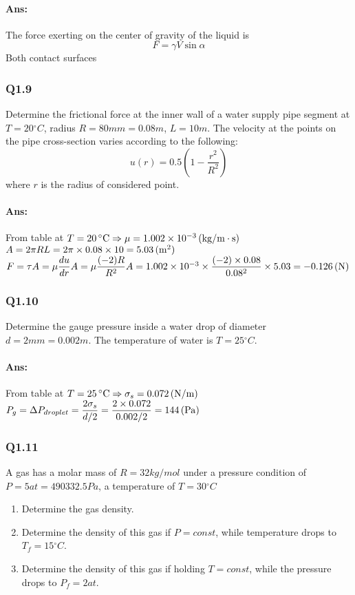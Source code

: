 \paragraph{Ans:}$  $\\
The force exerting on the center of gravity of the liquid is  \[F=\gamma V\sin\alpha\]
Both contact surfaces 

\subsubsection{Q1.9}
Determine the frictional force at the inner wall of a water supply pipe segment at $T= 20\unit{^\circ C} $, radius $ R = 80\unit{mm} = 0.08\unit{m}$, $L= 10 \unit{m} $. The velocity at the points on the pipe cross-section varies according
to the following:
\[u(r)=0.5\left(1-\dfrac{r^2}{R^2}\right)\]
where $ r $ is the radius of considered point.
\paragraph{Ans:}$ $\\
From table at $T= 20\, \mathrm{^\circ C} \Rightarrow \mu = 1.002\times10^{-3}\, (\mathrm{kg/m\cdot s})$\\
$ A = 2\pi R L = 2\pi\times 0.08\times 10 = 5.03\, (\mathrm{m^2})$\\
$F = \tau A = \mu \dfrac{du}{dr} A = \mu \dfrac{(-2)R}{R^2} A \\=1.002\times10^{-3} \times \dfrac{(-2)\times0.08}{0.08^2}\times 5.03 = -0.126\, (\mathrm{N})$

\subsubsection{Q1.10}
Determine the gauge pressure inside a water drop of diameter $ d = 2\unit{mm}=0.002\unit{m}$. The temperature of water is $ T=25\unit{^\circ C} $.
\paragraph{Ans:}$ $\\
From table at $T= 25\, \mathrm{^\circ C} \Rightarrow \sigma_s = 0.072\, (\mathrm{N/m})$\\
$ P_g= \Delta P_{droplet} = \dfrac{2\sigma_s}{d/2} = \dfrac{2\times0.072}{0.002/2}=144\, (\mathrm{Pa})$

\subsubsection{Q1.11}
A gas has a molar mass of $R= 32 \unit{kg/mol} $ under a pressure condition of $ P=5 \unit{at}=490332.5\unit{Pa} $, a temperature of $ T=30\unit{^\circ C} $
\begin{enumerate}
	\item Determine the gas density.
	\item Determine the density of this gas if $ P = const $, while temperature drops to $ T_f=15\unit{^\circ C} $.
	\item Determine the density of this gas if holding $ T = const $, while the pressure drops to $ P_f = 2 \unit{at} $.
\end{enumerate}
